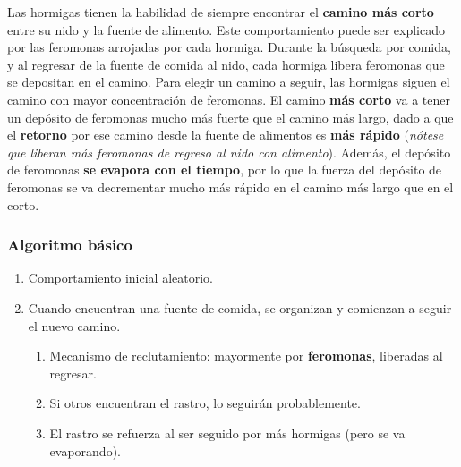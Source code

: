 \documentclass[10pt,a4paper]{article}
\begin{document}
Las hormigas tienen la habilidad de siempre encontrar el \textbf{camino más corto} entre su nido y la fuente de alimento. Este comportamiento puede ser explicado por las feromonas arrojadas por cada hormiga. Durante la búsqueda por comida, y al regresar de la fuente de comida al nido, cada hormiga libera feromonas que se depositan en el camino. Para elegir un camino a seguir, las hormigas siguen el camino con mayor concentración de feromonas. El camino \textbf{más corto} va a tener un depósito de feromonas mucho más fuerte que el camino más largo, dado a que el \textbf{retorno} por ese camino desde la fuente de alimentos es \textbf{más rápido} (\textit{nótese que liberan más feromonas de regreso al nido con alimento}). Además, el depósito de feromonas \textbf{se evapora con el tiempo}, por lo que la fuerza del depósito de feromonas se va decrementar mucho más rápido en el camino más largo que en el corto.

\subsubsection{Algoritmo básico}

\begin{enumerate}
\item Comportamiento inicial aleatorio.
\item Cuando encuentran una fuente de comida, se organizan y comienzan a seguir el nuevo camino.
\begin{enumerate}[2.1]
\item Mecanismo de reclutamiento: mayormente por \textbf{feromonas}, liberadas al regresar.
\item Si otros encuentran el rastro, lo seguirán probablemente.
\item El rastro se refuerza al ser seguido por más hormigas (pero se va evaporando).
\end{enumerate}
\end{enumerate}

\end{document}
